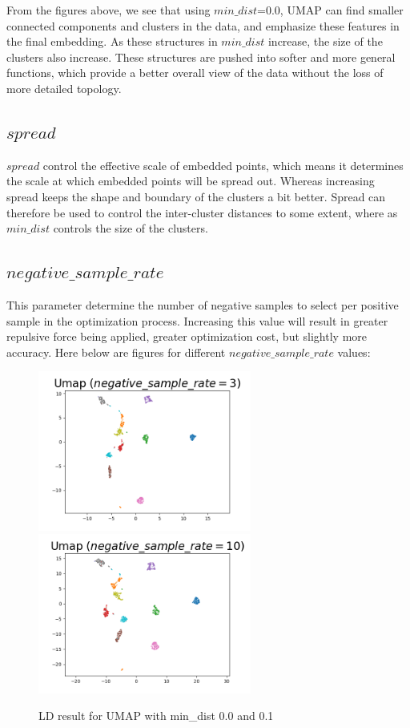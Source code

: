 
\noindent From the figures above, we see that using $min\_dist$=0.0, UMAP can find smaller connected components and clusters in the data, and emphasize these features in the final embedding. As these structures in $min\_dist$ increase, the size of the clusters also increase. These structures are pushed into softer and more general functions, which provide a better overall view of the data without the loss of more detailed topology. 

\subsection{$spread$}

$spread$ control the effective scale of embedded points, which means it determines the scale at which embedded points will be spread out. Whereas increasing spread keeps the shape and boundary of the clusters a bit better. Spread can therefore be used to control the inter-cluster distances to some extent, where as $min\_dist$ controls the size of the clusters.

\subsection{$negative\_sample\_rate$}

This parameter determine the number of negative samples to select per positive sample in the optimization process. Increasing this value will result in greater repulsive force being applied, greater optimization cost, but slightly more accuracy. Here below are figures for different $negative\_sample\_rate$ values:

\begin{figure}[H]
\centering  %
{
\label{Fig.sub.1}
\includegraphics[width=7cm,height=3.5cm\textwidth]{images/umap/umap_neg_3.png}}
{
\label{Fig.sub.2}
\includegraphics[width=7cm,height=3.5cm\textwidth]{images/umap/umap_neg_10.png}}
\caption{LD result for UMAP with min\_dist 0.0 and 0.1}
\end{figure}

